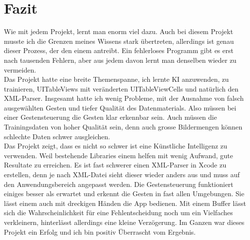 \documentclass[12pt]{article}
\begin{document}
\section{Fazit}
Wie mit jedem Projekt, lernt man enorm viel dazu. Auch bei diesem Projekt musste ich die Grenzen meines Wissens stark übertreten, allerdings ist genau dieser Prozess, der den einem antreibt. Ein fehlerloses Programm gibt es erst nach tausenden Fehlern, aber aus jedem davon lernt man denselben wieder zu vermeiden. \\ Das Projekt hatte eine breite Themenspanne, ich lernte KI anzuwenden, zu trainieren, UITableViews mit veränderten UITableViewCells und natürlich den XML-Parser. Insgesamt hatte ich wenig Probleme, mit der Ausnahme von falsch ausgewählten Gesten und tiefer Qualität des Datenmaterials. Also müssen bei einer Gestensteuerung die Gesten klar erkennbar sein. Auch müssen die Trainingsdaten von hoher Qualität sein, denn auch grosse Bildermengen können schlechte Daten schwer ausgleichen. \\ Das Projekt zeigt, dass es nicht  so schwer ist eine Künstliche Intelligenz zu verwenden. Weil bestehende Libraries einem helfen mit wenig Aufwand, gute Resultate zu erreichen. Es ist fast schwerer einen XML-Parser in Xcode zu erstellen, denn je nach XML-Datei sieht dieser wieder anders aus und muss auf den Anwendungsbereich angepasst werden. Die Gestensteuerung funktioniert einiges besser als erwartet und erkennt die Gesten in fast allen Umgebungen. Sie lässt einem auch mit dreckigen Händen die App bedienen. Mit einem Buffer lässt sich die Wahrscheinlichkeit für eine Fehlentscheidung noch um ein Vielfaches verkleinern, hinterlässt allerdings eine kleine Verzögerung. Im Ganzen war dieses Projekt ein Erfolg und ich bin positiv Überrascht vom Ergebnis.


\renewcommand\refname{Bibliografie}
\newpage

\end{document}
